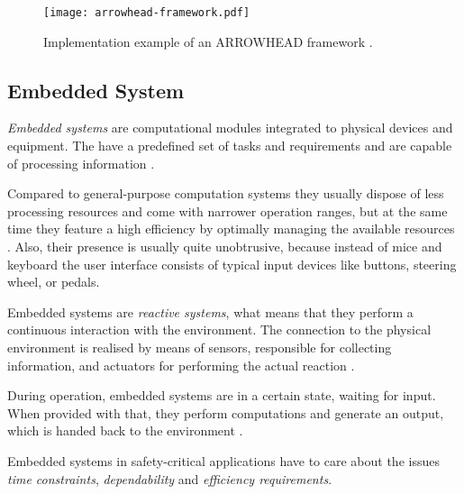 \begin{figure}[ht]
\centering
\texttt{[image: arrowhead-framework.pdf]}
\caption{Implementation example of an ARROWHEAD framework \cite{arrowhead:presentation}.}
\label{fig:arrowhead-framework}
\end{figure}

\subsection{Embedded System}
\label{sec:embedded_system}

\emph{Embedded systems} are computational modules integrated to physical devices and equipment. The have a predefined set of tasks and requirements and are capable of processing information \cite{rodrigues2011} \cite[p.xiii]{marwedel}. 

Compared to general-purpose computation systems they usually dispose of less processing resources and come with narrower operation ranges, but at the same time they feature a high efficiency by optimally managing the available resources \cite[p.283]{alippi} \cite[p.5]{marwedel}. Also, their presence is usually quite unobtrusive, because instead of mice and keyboard the user interface consists of typical input devices like buttons, steering wheel, or pedals.

Embedded systems are \emph{reactive systems}, what means that they perform a continuous interaction with the environment. The connection to the physical environment is realised by means of sensors, responsible for collecting information, and actuators for performing the actual reaction \cite[p.8-9]{marwedel}. 

During operation, embedded systems are in a certain state, waiting for input. When provided with that, they perform computations and generate an output, which is handed back to the environment \cite[p.9]{marwedel}.

Embedded systems in safety-critical applications have to care about the issues \emph{time constraints}, \emph{dependability} and \emph{efficiency requirements}.

